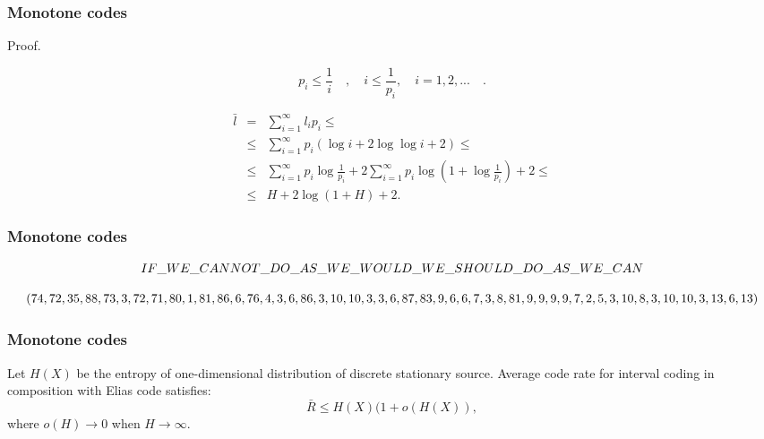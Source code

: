 \documentclass[14pt]{beamer}
\begin{document}
\begin{frame}
\frametitle{Monotone codes}
Proof.
\begin{itemize}    
\small{    
    
    \item 
    \begin{equation}
    \label{eq4_6} p_i \le \frac{1}{i} \quad , \quad i \le \frac{1}{p_i
    }, \quad i = 1,2,... \quad .
    \end{equation}
    
    \item 
    \begin{eqnarray}
    \label{eq4_7}
    \bar {l} &=& \sum\limits_{i = 1}^\infty {l_i p_i \le }\nonumber\\
    &\le& \sum\limits_{i = 1}^\infty {p_i (\log i + 2\log \log i + 2)}
    \le \nonumber\\
    &\le& \sum\limits_{i = 1}^\infty {p_i \log \frac{1}{p_i } + }
    2\sum\limits_{i = 1}^\infty {p_i \log \left( {1 + \log \frac{1}{p_i
    }} \right) + } 2 \le\nonumber\\
    &\le& H + 2\log (1 + H) + 2.
    \end{eqnarray}
}
\end{itemize}
\end{frame}





\begin{frame}
\frametitle{Monotone codes}


    \item{    
    \footnotesize{
    \[
    IF{\_}WE{\_}CANNOT{\_}DO{\_}AS{\_}WE{\_}WOULD{\_}WE{\_}SHOULD\\
    {\_}DO{\_}AS{\_}WE{\_}CAN
    \]
    }
    }
    
    \item{
    \footnotesize{
    \[
    (74, 72, 35, 88, 73, 3, 72, 71, 80, 1, 81, 86, 6,\\
    76, 4, 3, 6, 86, 3, 10, 10, 3, 3, 6, 87, 83, 9, 6, 6, 7, 3, 8, 81,\\
    9, 9, 9, 9, 7, 2, 5, 3, 10, 8, 3, 10, 10, 3, 13, 6, 13)
    \]
    }
    }

\end{frame}



\begin{frame}
\frametitle{Monotone codes}
   

    \begin{theorem}Let $H(X)$ be the entropy of one-dimensional distribution of discrete stationary source. Average code rate for interval coding in composition with Elias code satisfies:
    \[
    \bar {R} \le H(X)(1 + o(H(X)),
    \]
    where $o(H) \to 0$ when $H \to \infty $.
    \end{theorem}

\end{frame}
\end{document}
